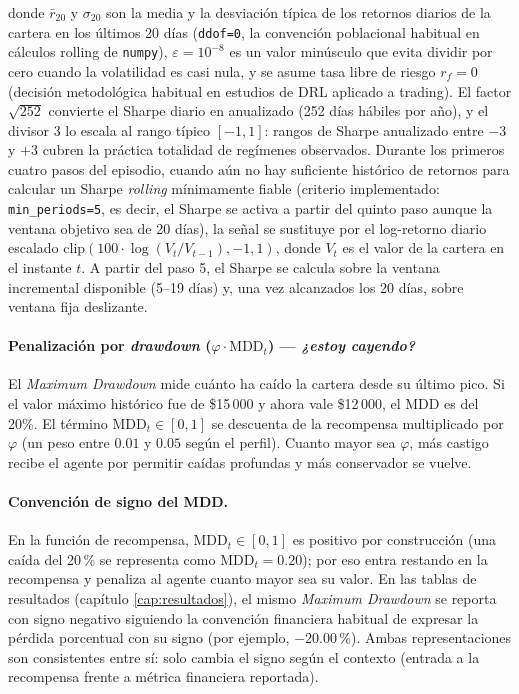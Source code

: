 \documentclass[IB,a4paper]{TFUOC}
\begin{document}
donde $\bar{r}_{20}$ y $\sigma_{20}$ son la media y la desviación típica de los retornos diarios de la cartera en los últimos 20 días (\texttt{ddof=0}, la convención poblacional habitual en cálculos rolling de \texttt{numpy}), $\varepsilon = 10^{-8}$ es un valor minúsculo que evita dividir por cero cuando la volatilidad es casi nula, y se asume tasa libre de riesgo $r_f = 0$ (decisión metodológica habitual en estudios de DRL aplicado a trading). El factor $\sqrt{252}$ convierte el Sharpe diario en anualizado (252 días hábiles por año), y el divisor 3 lo escala al rango típico $[-1, 1]$: rangos de Sharpe anualizado entre $-3$ y $+3$ cubren la práctica totalidad de regímenes observados. Durante los primeros cuatro pasos del episodio, cuando aún no hay suficiente histórico de retornos para calcular un Sharpe \textit{rolling} mínimamente fiable (criterio implementado: \texttt{min\_periods=5}, es decir, el Sharpe se activa a partir del quinto paso aunque la ventana objetivo sea de 20 días), la señal se sustituye por el log-retorno diario escalado $\mathrm{clip}(100 \cdot \log(V_t/V_{t-1}), -1, 1)$, donde $V_t$ es el valor de la cartera en el instante $t$. A partir del paso 5, el Sharpe se calcula sobre la ventana incremental disponible (5--19 días) y, una vez alcanzados los 20 días, sobre ventana fija deslizante.

\paragraph{Penalización por \textit{drawdown} ($\varphi \cdot \mathrm{MDD}_t$) — \textit{¿estoy cayendo?}} El \textit{Maximum Drawdown} mide cuánto ha caído la cartera desde su último pico. Si el valor máximo histórico fue de \$15\,000 y ahora vale \$12\,000, el MDD es del 20\%. El término $\mathrm{MDD}_t \in [0,1]$ se descuenta de la recompensa multiplicado por $\varphi$ (un peso entre $0.01$ y $0.05$ según el perfil). Cuanto mayor sea $\varphi$, más castigo recibe el agente por permitir caídas profundas y más conservador se vuelve.

\paragraph{Convención de signo del MDD.} En la función de recompensa, $\mathrm{MDD}_t \in [0, 1]$ es positivo por construcción (una caída del 20\,\% se representa como $\mathrm{MDD}_t = 0.20$); por eso entra restando en la recompensa y penaliza al agente cuanto mayor sea su valor. En las tablas de resultados (capítulo \ref{cap:resultados}), el mismo \textit{Maximum Drawdown} se reporta con signo negativo siguiendo la convención financiera habitual de expresar la pérdida porcentual con su signo (por ejemplo, $-20.00$\,\%). Ambas representaciones son consistentes entre sí: solo cambia el signo según el contexto (entrada a la recompensa frente a métrica financiera reportada).
\end{document}
